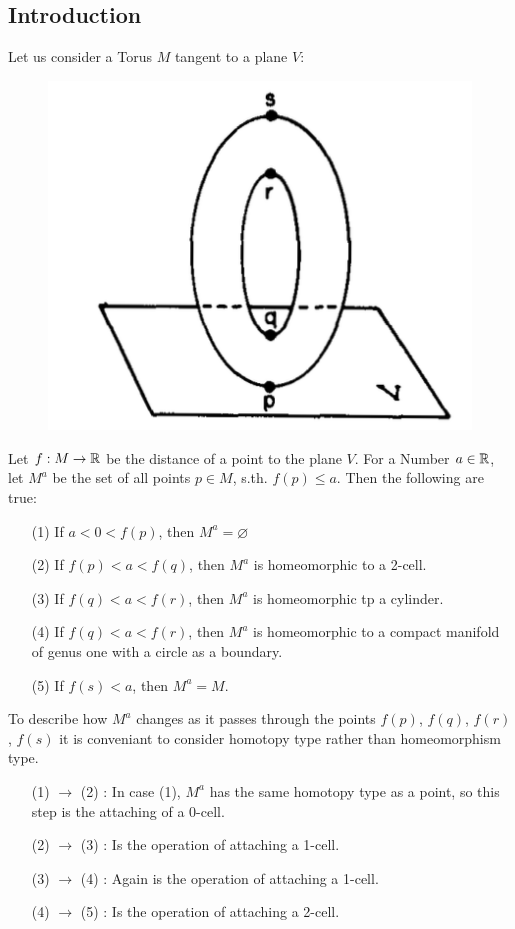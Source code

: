 \subsection{Introduction}

Let us consider a Torus $M$ tangent to a plane $V$:
\begin{figure}[H]
    \centering
    \includegraphics[width=0.4\linewidth]{resources/Mil-Diagram1.png}
    \label{fig:mil-diagram1}
\end{figure}
Let $f: M \rightarrow {\mathbb R}$ be the distance of a point to the plane $V$. 
For a Number $a \in {\mathbb R} $, let $M^a$ be the set of all points $p \in M$, s.th. 
$f(p) \leq a$.
Then the following are true:
\begin{enumerate}
   \item[(1)] If $a < 0 < f(p)$, then $M^a = \varnothing$
   \item[(2)] If $f(p) < a < f(q)$, then $M^a$ is homeomorphic to a 2-cell.
   \item[(3)] If $f(q) < a < f(r)$, then $M^a$ is homeomorphic tp a cylinder.
   \item[(4)] If $f(q) < a < f(r)$, then $M^a$ is homeomorphic to a compact 
   manifold of genus one with a circle as a boundary.
   \item[(5)] If $f(s) < a$, then $M^a = M$.
\end{enumerate}

To describe how $M^a$ changes as it passes through the points $f(p)$, $f(q)$, 
$f(r)$, $f(s)$ it is conveniant to consider
homotopy type rather than homeomorphism type. 
\begin{enumerate}[leftmargin=2cm]
   \item[(1) $\rightarrow$ (2)]: In case (1), $M^a$ has the same homotopy type 
   as a point, so this step is the attaching of a 0-cell. 
   \item[(2) $\rightarrow$ (3)]: Is the operation of attaching a 1-cell. 
   \item[(3) $\rightarrow$ (4)]: Again is the operation of attaching a 1-cell. 
   \item[(4) $\rightarrow$ (5)]: Is the operation of attaching a 2-cell. 
\end{enumerate}

